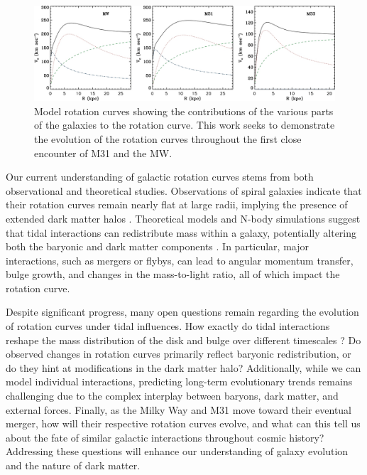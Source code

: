 \documentclass[twocolumn,linenumbers,trackchanges]{aastex7}
\begin{document}
\begin{figure}[ht!]
	\centering
	\includegraphics[width=1.0\linewidth]{Rotation_Curves_Besla.jpg}
	\caption{Model rotation curves showing the contributions of the various parts of the galaxies to the rotation curve. This work seeks to demonstrate the evolution of the rotation curves throughout the first close encounter of M31 and the MW.}
\end{figure}

Our current understanding of galactic rotation curves stems from both observational and theoretical studies.
Observations of spiral galaxies indicate that their rotation curves remain nearly flat at large radii, implying the presence of extended dark matter halos \citep{GalacticBulges}.
Theoretical models and N-body simulations suggest that tidal interactions can redistribute mass within a galaxy, potentially altering both the baryonic and dark matter components \citep{Besla2012}.
In particular, major interactions, such as mergers or flybys, can lead to angular momentum transfer, bulge growth, and changes in the mass-to-light ratio, all of which impact the rotation curve.

Despite significant progress, many open questions remain regarding the evolution of rotation curves under tidal influences.
How exactly do tidal interactions reshape the mass distribution of the disk and bulge over different timescales \citep{Kannan2015}?
Do observed changes in rotation curves primarily reflect baryonic redistribution, or do they hint at modifications in the dark matter halo?
Additionally, while we can model individual interactions, predicting long-term evolutionary trends remains challenging due to the complex interplay between baryons, dark matter, and external forces.
Finally, as the Milky Way and M31 move toward their eventual merger, how will their respective rotation curves evolve, and what can this tell us about the fate of similar galactic interactions throughout cosmic history?
Addressing these questions will enhance our understanding of galaxy evolution and the nature of dark matter.
\end{document}
